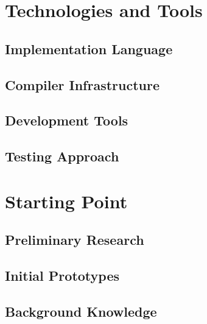 \section{Technologies and Tools}

\subsection{Implementation Language}

\subsection{Compiler Infrastructure}

\subsection{Development Tools}

\subsection{Testing Approach}

\section{Starting Point}

\subsection{Preliminary Research}

\subsection{Initial Prototypes}

\subsection{Background Knowledge} 